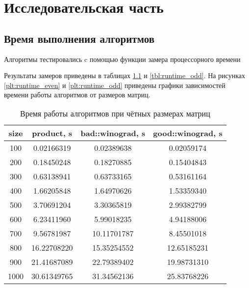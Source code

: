 \chapter{Исследовательская часть}

\section{Время выполнения алгоритмов}

Алгоритмы тестировались c помощью функции замера процессорного времени 

Результаты замеров приведены в таблицах \ref{tbl:runtime_even} и \ref{tbl:runtime_odd}.
На рисунках \ref{plt:runtime_even} и \ref{plt:runtime_odd} приведены графики зависимостей времени работы алгоритмов от размеров матриц.

\begin{table}
	\begin{center}
		\begin{tabular}{|c|c|c|c|}
			\hline
			size&          product, s&    bad::winograd, s&   good::winograd, s\\
			\hline
			 100&          0.02166319&          0.02389638&          0.02059174\\
			\hline
			 200&          0.18450248&          0.18270885&          0.15404843\\
			\hline
			 300&          0.63138941&          0.63733165&          0.53161164\\
			\hline
			 400&          1.66205848&          1.64970626&          1.53359340\\
			\hline
			 500&          3.70691204&          3.30365819&          2.99382799\\
			\hline
			 600&          6.23411960&          5.99018235&          4.94188006\\
			\hline
			 700&          9.56781987&         10.11701787&          8.45501018\\
			\hline
			 800&         16.22708220&         15.35254552&         12.65185231\\
			\hline
			 900&         21.41687089&         22.79389402&         19.98731310\\
			\hline
			1000&         30.61349765&         31.34562136&         25.83768226\\
			\hline
		\end{tabular}
	\end{center}
	\caption{Время работы алгоритмов при чётных размерах матриц}
	\label{tbl:runtime_even}
\end{table}

